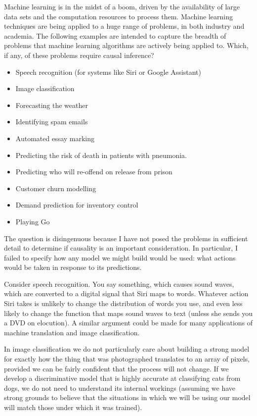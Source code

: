 \documentclass[11pt,a4paper,twoside]{report}
\theoremstyle{plain}
\theoremstyle{definition}
\begin{document}
Machine learning is in the midst of a boom, driven by the availability of large data sets and the computation resources to process them. Machine learning techniques are being applied to a huge range of problems, in both industry and academia. The following examples are intended to capture the breadth of problems that machine learning algorithms are actively being applied to. Which, if any, of these problems require causal inference? 

\begin{itemize}
\item Speech recognition (for systems like Siri or Google Assistant)
\item Image classification
\item Forecasting the weather
\item Identifying spam emails
\item Automated essay marking
\item Predicting the risk of death in patients with pneumonia.
\item Predicting who will re-offend on release from prison 
\item Customer churn modelling
\item Demand prediction for inventory control
\item Playing Go 
\end{itemize}

The question is disingenuous because I have not posed the problems in sufficient detail to determine if causality is an important consideration. In particular, I failed to specify how any model we might build would be used: what actions would be taken in response to its predictions. 

Consider speech recognition. You say something, which causes sound waves, which are converted to a digital signal that Siri maps to words. Whatever action Siri takes is unlikely to change the distribution of words you use, and even less likely to change the function that maps sound waves to text (unless she sends you a DVD on elocution). A similar argument could be made for many applications of machine translation and image classification. 

In image classification we do not particularly care about building a strong model for exactly how the thing that was photographed translates to an array of pixels, provided we can be fairly confident that the process will not change. If we develop a discriminative model that is highly accurate at classifying cats from dogs, we do not need to understand its internal workings (assuming we have strong grounds to believe that the situations in which we will be using our model will match those under which it was trained).
\end{document}
